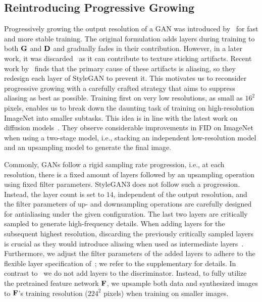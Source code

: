 \subsection{Reintroducing Progressive Growing}
Progressively growing the output resolution of a GAN was introduced by~\cite{Karras2018ICLR} for fast and more stable training. The original formulation adds layers during training to both $\mathbf{G}$ and $\mathbf{D}$ and gradually fades in their contribution. However, in a later work, it was discarded~\cite{Karras2020CVPR} as it can contribute to texture sticking artifacts. Recent work by~\cite{Karras2021NEURIPS} finds that the primary cause of these artifacts is aliasing, so they redesign each layer of StyleGAN to prevent it. This motivates us to reconsider progressive growing with a carefully crafted strategy that aims to suppress aliasing as best as possible. Training first on very low resolutions, as small as $16^2$ pixels, enables us to break down the daunting task of training on high-resolution ImageNet into smaller subtasks. This idea is in line with the latest work on diffusion models~\cite{Nichol2021ICML, Saharia2021ARXIV, Dhariwal2021NEURIPS, Ho2022JMLR}. They observe considerable improvements in FID on ImageNet when using a two-stage model, i.e., stacking an independent low-resolution model and an upsampling model to generate the final image.

Commonly, GANs follow a rigid sampling rate progression, i.e., at each resolution, there is a fixed amount of layers followed by an upsampling operation using fixed filter parameters. StyleGAN3 does not follow such a progression. Instead, the layer count is set to $14$, independent of the output resolution, and the filter parameters of up- and downsampling operations are carefully designed for antialiasing under the given configuration. The last two layers are critically sampled to generate high-frequency details. When adding layers for the subsequent highest resolution, discarding the previously critically sampled layers is crucial as they would introduce aliasing when used as intermediate layers~\cite{Karras2020CVPR, Karras2021NEURIPS}. Furthermore, we adjust the filter parameters of the added layers to adhere to the flexible layer specification of~\cite{Karras2021NEURIPS}; we refer to the supplementary for details. In contrast to~\cite{Karras2018ICLR} we do not add layers to the discriminator. Instead, to fully utilize the pretrained feature network $\mathbf{F}$, we upsample both data and synthesized images to $\mathbf{F}$'s training resolution ($224^2$ pixels) when training on smaller images.

